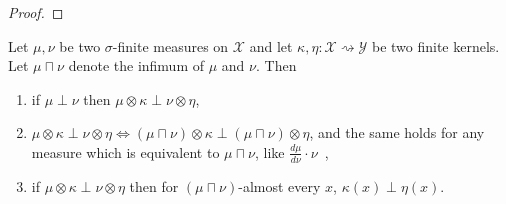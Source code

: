 \begin{proof}\leanok
{}

\end{proof}


\begin{lemma}
  \label{lem:mutuallySingular_compProd}
  Let $\mu, \nu$ be two $\sigma$-finite measures on $\mathcal X$ and let $\kappa, \eta : \mathcal X \rightsquigarrow \mathcal Y$ be two finite kernels.
  Let $\mu \sqcap \nu$ denote the infimum of $\mu$ and $\nu$.
  Then
  \begin{enumerate}
    \item if $\mu \perp \nu$ then $\mu \otimes \kappa \perp \nu \otimes \eta$,
    \item $\mu \otimes \kappa \perp \nu \otimes \eta \iff (\mu \sqcap \nu) \otimes \kappa \perp (\mu \sqcap \nu) \otimes \eta$, and the same holds for any measure which is equivalent to $\mu \sqcap \nu$, like $\frac{d \mu}{d \nu} \cdot \nu$~,
    \item if $\mu \otimes \kappa \perp \nu \otimes \eta$ then for $(\mu \sqcap \nu)$-almost every $x$, $\kappa(x) \perp \eta(x)$.
  \end{enumerate}
\end{lemma}


